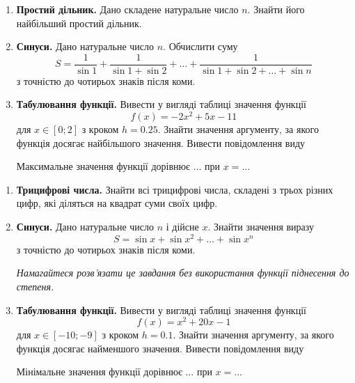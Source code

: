  


\begin{enumerate}
\item \textbf{Простий дільник.} Дано складене натуральне число $n$. Знайти його найбільший простий дільник.
\item \textbf{Синуси.} Дано натуральне число $n$. Обчислити суму
$$
S=\frac{1}{\sin 1}+\frac{1}{\sin 1+\sin 2}+\ldots+\frac{1}{\sin 1+\sin 2+\ldots+\sin n}
$$
з точністю до чотирьох знаків після коми.
\item \textbf{Табулювання функції.} Вивести у вигляді таблиці значення функції
$$
f(x)=-2x^2+5x-11
$$
для $x \in [0; 2]$ з кроком $ h = 0.25 $. Знайти значення аргументу, за якого функція досягає найбільшого значення. Вивести повідомлення виду

 {\ttfamily\color{blue} Максимальне значення функції дорівнює $\ldots$  при  $x = \ldots $ }
\end{enumerate}


 


\begin{enumerate}
\item \textbf{Трицифрові числа.} Знайти всі трицифрові числа, складені з трьох різних цифр, які діляться на квадрат суми своїх цифр.
\item \textbf{Синуси.} Дано натуральне число $n$ і дійсне $x$. Знайти значення виразу
$$
S=\sin x+\sin x^2 +\ldots +\sin x^n
$$
з точністю до чотирьох знаків після коми.

{\itshape Намагайтеся розв'язати це завдання без використання функції піднесення до степеня.}
\item \textbf{Табулювання функції.} Вивести у вигляді таблиці значення функції
$$
f(x)=x^2+20x-1
$$
для $ x \in [-10; -9]$ з кроком $h=0.1$. Знайти значення аргументу, за якого функція досягає найменшого значення. Вивести повідомлення виду

 {\ttfamily\color{blue} Мінімальне значення функції дорівнює $\ldots$  при  $x = \ldots $ }
\end{enumerate}


 


